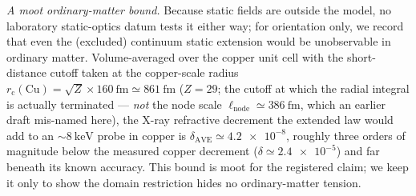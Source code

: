 \documentclass[aps,prd,twocolumn,superscriptaddress,nofootinbib,longbibliography]{revtex4-2}
\begin{document}
\emph{A moot ordinary-matter bound.} Because static fields are outside the model,
no laboratory static-optics datum tests it either way; for orientation only, we
record that even the (excluded) continuum static extension would be unobservable
in ordinary matter. Volume-averaged over the copper unit cell with the
short-distance cutoff taken at the copper-scale radius
$r_{\mathrm c}(\mathrm{Cu})=\sqrt{Z}\times\SI{160}{\femto\meter}\simeq
\SI{861}{\femto\meter}$ ($Z=29$; the cutoff at which the radial integral is
actually terminated --- \emph{not} the node scale $\ell_{\mathrm{node}}\simeq
\SI{386}{\femto\meter}$, which an earlier draft mis-named here), the X-ray
refractive decrement the extended law would add to an
$\sim\!\SI{8}{\kilo\electronvolt}$ probe in copper is
$\delta_{\mathrm{AVE}}\simeq\num{4.2e-8}$, roughly three orders of magnitude below
the measured copper decrement ($\delta\simeq\num{2.4e-5}$) and far beneath its
known accuracy. This bound is moot for the registered claim; we keep it only to
show the domain restriction hides no ordinary-matter tension.
\end{document}

